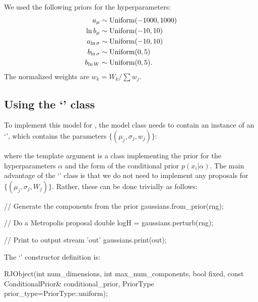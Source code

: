 \documentclass[article]{jss}
\begin{document}
We used the following priors for the hyperparameters:
\begin{align*}
a_\mu &\sim \textnormal{Uniform}(-1000, 1000)\\
\ln b_\mu &\sim \textnormal{Uniform}(-10, 10)\\
a_{\ln\sigma} &\sim \textnormal{Uniform}(-10, 10)\\
b_{\ln\sigma} &\sim \textnormal{Uniform}(0, 5)\\
b_{\ln W} &\sim \textnormal{Uniform}(0, 5).
\end{align*}
The normalized weights are $w_k = W_k/\sum w_j$.

\subsection[Using the `RJObject' class]{Using the `' class}
To implement this model for , the model
class needs to contain an instance of an
`', which contains the parameters
$\{(\mu_j, \sigma_j, w_j)\}$:
%
\begin{CodeChunk}
\begin{CodeInput}
class MyModel
{
    private:
        DNest4::RJObject<MyConditionalPrior> gaussians;
....
\end{CodeInput}
\end{CodeChunk}
%
where the template argument 
is a class implementing the prior for the hyperparameters
$\alpha$ and the form of the conditional prior $p(x_i | \alpha)$.
The main advantage of the `' class is that
we do not need to implement any proposals for $\{(\mu_j, \sigma_j, W_j)\}$.
Rather, these can be done trivially as follows:
%
\begin{CodeChunk}
\begin{CodeInput}
    // Generate the components from the prior
    gaussians.from_prior(rng);

    // Do a Metropolis proposal
    double logH = gaussians.perturb(rng);

    // Print to output stream 'out'
    gaussians.print(out);
\end{CodeInput}
\end{CodeChunk}
%
The `' constructor definition is:
%
\begin{CodeChunk}
\begin{CodeInput}
RJObject(int num_dimensions, int max_num_components, bool fixed,
         const ConditionalPrior& conditional_prior,
         PriorType prior_type=PriorType::uniform);
\end{CodeInput}
\end{CodeChunk}
\end{document}
